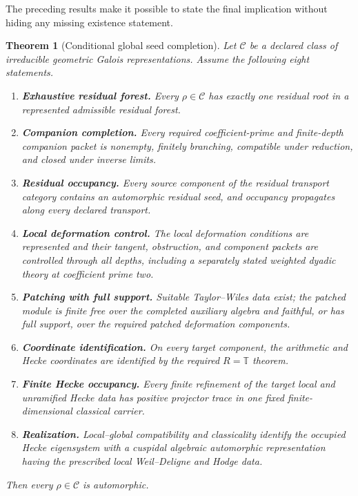 \documentclass[11pt]{article}
\newtheorem{theorem}{Theorem}[section]
\theoremstyle{definition}
\theoremstyle{remark}
\newcommand{\T}{\mathbb T}
\begin{document}
The preceding results make it possible to state the final implication without hiding any missing existence statement.

\begin{theorem}[Conditional global seed completion]
Let $\mathscr C$ be a declared class of irreducible geometric Galois representations.  Assume the following eight statements.

\begin{enumerate}
\item \textbf{Exhaustive residual forest.} Every $\rho\in\mathscr C$ has exactly one residual root in a represented admissible residual forest.
\item \textbf{Companion completion.} Every required coefficient-prime and finite-depth companion packet is nonempty, finitely branching, compatible under reduction, and closed under inverse limits.
\item \textbf{Residual occupancy.} Every source component of the residual transport category contains an automorphic residual seed, and occupancy propagates along every declared transport.
\item \textbf{Local deformation control.} The local deformation conditions are represented and their tangent, obstruction, and component packets are controlled through all depths, including a separately stated weighted dyadic theory at coefficient prime two.
\item \textbf{Patching with full support.} Suitable Taylor--Wiles data exist; the patched module is finite free over the completed auxiliary algebra and faithful, or has full support, over the required patched deformation components.
\item \textbf{Coordinate identification.} On every target component, the arithmetic and Hecke coordinates are identified by the required $R=\T$ theorem.
\item \textbf{Finite Hecke occupancy.} Every finite refinement of the target local and unramified Hecke data has positive projector trace in one fixed finite-dimensional classical carrier.
\item \textbf{Realization.} Local--global compatibility and classicality identify the occupied Hecke eigensystem with a cuspidal algebraic automorphic representation having the prescribed local Weil--Deligne and Hodge data.
\end{enumerate}

Then every $\rho\in\mathscr C$ is automorphic.
\end{theorem}
\end{document}
